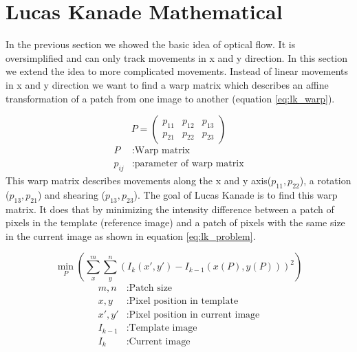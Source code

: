 \documentclass[11pt,a4paper,titlepage,oneside]{report}
\begin{document}
\section{Lucas Kanade Mathematical}

In the previous section we showed the basic idea of optical flow. It is oversimplified and can only track movements in x and y direction. In this section we extend the idea to more complicated movements. Instead of linear movements in x and y direction we want to find a warp matrix which describes an affine transformation of a patch from one image to another (equation \ref{eq:lk_warp}).

\begin{equation}\label{eq:lk_warp}
  P=\begin{pmatrix}
    p_{11} & p_{12} & p_{13} \\
    p_{21} & p_{22} & p_{23}
  \end{pmatrix}
\end{equation}
\begin{align*}
  P       &:  \text{Warp matrix}\\
  p_{ij}  &:  \text{parameter of warp matrix}
\end{align*}
This warp matrix describes movements along the x and y axis($p_{11},p_{22}$), a rotation ($p_{13},p_{21}$) and shearing ($p_{13},p_{23}$). The goal of Lucas Kanade is to find this warp matrix. It does that by minimizing the intensity difference between a patch of pixels in the template (reference image) and a patch of pixels with the same size in the current image as shown in equation \ref{eq:lk_problem}. 

\begin{equation}\label{eq:lk_problem}
  \min_P(\sum_x^m\sum_y^n(I_{k}(x',y')-I_{k-1}(x(P),y(P)))^2)
\end{equation}
\begin{align*}
  m,n       &: \text{Patch size}\\
  x,y       &: \text{Pixel position in template}\\
  x',y'     &: \text{Pixel position in current image}\\
  I_{k-1}   &: \text{Template image}\\
  I_{k}     &: \text{Current image}\\
\end{align*}
\end{document}
